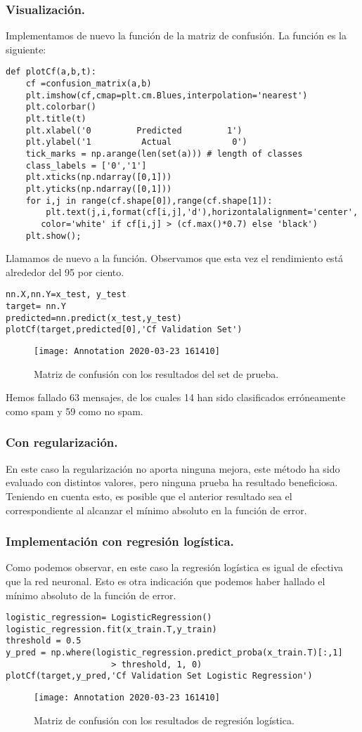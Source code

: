 \documentclass[a4paper,11pt]{article}
\begin{document}
\subsubsection{Visualización.}
Implementamos de nuevo la función de la matriz de confusión. La función es la siguiente:
\begin{lstlisting}
def plotCf(a,b,t):
    cf =confusion_matrix(a,b)
    plt.imshow(cf,cmap=plt.cm.Blues,interpolation='nearest')
    plt.colorbar()
    plt.title(t)
    plt.xlabel('0         Predicted         1')
    plt.ylabel('1          Actual            0')
    tick_marks = np.arange(len(set(a))) # length of classes
    class_labels = ['0','1']
    plt.xticks(np.ndarray([0,1]))
    plt.yticks(np.ndarray([0,1]))
    for i,j in range(cf.shape[0]),range(cf.shape[1]):
        plt.text(j,i,format(cf[i,j],'d'),horizontalalignment='center',    
	   color='white' if cf[i,j] > (cf.max()*0.7) else 'black')
    plt.show();
\end{lstlisting}
Llamamos de nuevo a la función. Observamos que esta vez el rendimiento está alrededor del 95 por ciento.
\begin{lstlisting}
nn.X,nn.Y=x_test, y_test 
target= nn.Y
predicted=nn.predict(x_test,y_test) 
plotCf(target,predicted[0],'Cf Validation Set')
\end{lstlisting}
\begin{figure}[H]
\centering
\texttt{[image: Annotation 2020-03-23 161410]}
\caption{Matriz de confusión con los resultados del set de prueba.}
\end{figure}
Hemos fallado 63 mensajes, de los cuales 14 han sido clasificados erróneamente como spam y 59 como no spam.
\subsubsection{Con regularización.}
En este caso la regularización no aporta ninguna mejora, este método ha sido evaluado con distintos valores, pero ninguna prueba ha resultado beneficiosa. Teniendo en cuenta esto, es posible que el anterior resultado sea el correspondiente al alcanzar el mínimo absoluto en la función de error.

\subsubsection{Implementación con regresión logística.}
Como podemos observar, en este caso la regresión logística es igual de efectiva que la red neuronal. Esto es otra indicación que podemos haber hallado el mínimo absoluto de la función de error.
\begin{lstlisting}
logistic_regression= LogisticRegression()
logistic_regression.fit(x_train.T,y_train)
threshold = 0.5
y_pred = np.where(logistic_regression.predict_proba(x_train.T)[:,1]
					 > threshold, 1, 0)
plotCf(target,y_pred,'Cf Validation Set Logistic Regression')
\end{lstlisting}
\begin{figure}[H]
\centering
\texttt{[image: Annotation 2020-03-23 161410]}
\caption{Matriz de confusión con los resultados de regresión logística.}
\end{figure}
\newpage
\end{document}
